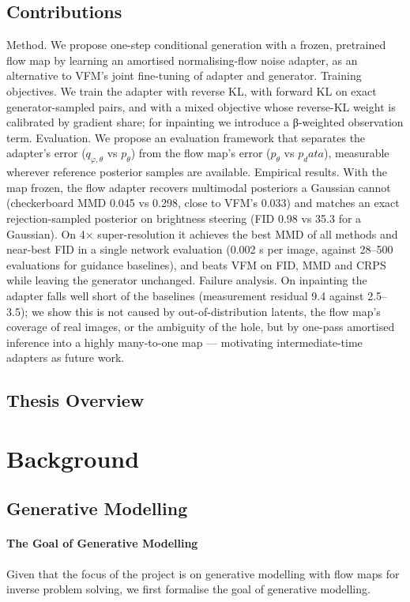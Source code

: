 \documentclass[12pt,a4paper]{report}
\begin{document}
\section{Contributions}
Method. We propose one-step conditional generation with a frozen, pretrained flow map by learning an amortised normalising-flow noise adapter, as an alternative to VFM's joint fine-tuning of adapter and generator.
Training objectives. We train the adapter with reverse KL, with forward KL on exact generator-sampled pairs, and with a mixed objective whose reverse-KL weight is calibrated by gradient share; for inpainting we introduce a β-weighted observation term.
Evaluation. We propose an evaluation framework that separates the adapter's error ($q_{φ,θ}$ vs $p_θ$) from the flow map's error ($p_θ$ vs $p_data$), measurable wherever reference posterior samples are available.
Empirical results. With the map frozen, the flow adapter recovers multimodal posteriors a Gaussian cannot (checkerboard MMD 0.045 vs 0.298, close to VFM's 0.033) and matches an exact rejection-sampled posterior on brightness steering (FID 0.98 vs 35.3 for a Gaussian). On 4× super-resolution it achieves the best MMD of all methods and near-best FID in a single network evaluation (0.002 s per image, against 28–500 evaluations for guidance baselines), and beats VFM on FID, MMD and CRPS while leaving the generator unchanged.
Failure analysis. On inpainting the adapter falls well short of the baselines (measurement residual 9.4 against 2.5–3.5); we show this is not caused by out-of-distribution latents, the flow map's coverage of real images, or the ambiguity of the hole, but by one-pass amortised inference into a highly many-to-one map — motivating intermediate-time adapters as future work.

\section{Thesis Overview}

\chapter{Background}           
\section{Generative Modelling}      
\label{sec:generative-modelling}
\subsubsection{The Goal of Generative Modelling}
Given that the focus of the project is on generative modelling with flow maps for inverse problem solving, we first formalise the goal of generative modelling. 
\end{document}
